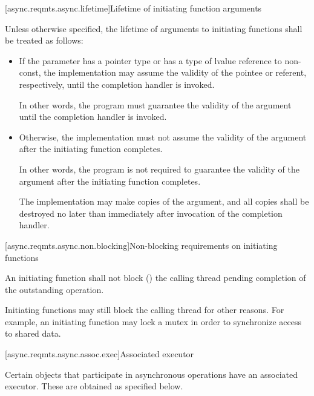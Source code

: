 [async.reqmts.async.lifetime]{Lifetime of initiating function arguments}

%
\pnum
 Unless otherwise specified, the lifetime of arguments to initiating functions shall be treated as follows:

\begin{itemize}
\item
If the parameter has a pointer type or has a type of lvalue reference to non-const, the implementation may assume the validity of the pointee or referent, respectively, until the completion handler is invoked. \begin{note} In other words, the program must guarantee the validity of the argument until the completion handler is invoked. \end{note}

\item
Otherwise, the implementation must not assume the validity of the argument after the initiating function completes. \begin{note} In other words, the program is not required to guarantee the validity of the argument after the initiating function completes. \end{note} The implementation may make copies of the argument, and all copies shall be destroyed no later than immediately after invocation of the completion handler.
\end{itemize}



[async.reqmts.async.non.blocking]{Non-blocking requirements on initiating functions}

%
\pnum
 An initiating function shall not block () the calling thread pending completion of the outstanding operation.

\pnum
 \begin{note} Initiating functions may still block the calling thread for other reasons. For example, an initiating function may lock a mutex in order to synchronize access to shared data. \end{note}



[async.reqmts.async.assoc.exec]{Associated executor}

%
\pnum
Certain objects that participate in asynchronous operations have an associated executor. These are obtained as specified below.



